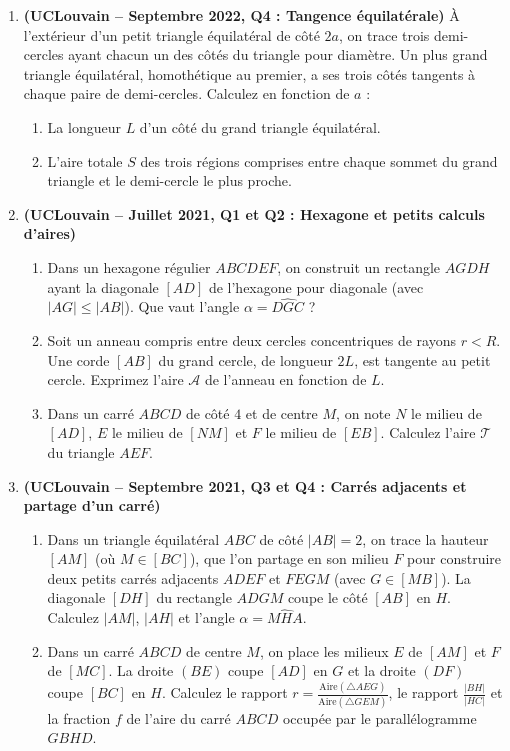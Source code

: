 \begin{enumerate}[label=\textbf{Exercice 5.\arabic* --}, align=left, leftmargin=*]
    \item \textbf{(UCLouvain -- Septembre 2022, Q4 : Tangence équilatérale)}
    À l'extérieur d'un petit triangle équilatéral de côté $2a$, on trace trois demi-cercles ayant chacun un des côtés du triangle pour diamètre. Un plus grand triangle équilatéral, homothétique au premier, a ses trois côtés tangents à chaque paire de demi-cercles. Calculez en fonction de $a$ :
    \begin{enumerate}[label=(\alph*)]
        \item La longueur $L$ d'un côté du grand triangle équilatéral.
        \item L'aire totale $S$ des trois régions comprises entre chaque sommet du grand triangle et le demi-cercle le plus proche.
    \end{enumerate}

    \item \textbf{(UCLouvain -- Juillet 2021, Q1 et Q2 : Hexagone et petits calculs d'aires)}
    \begin{enumerate}[label=(\alph*)]
        \item Dans un hexagone régulier $ABCDEF$, on construit un rectangle $AGDH$ ayant la diagonale $[AD]$ de l'hexagone pour diagonale (avec $|AG| \le |AB|$). Que vaut l'angle $\alpha = \widehat{DGC}$ ?
        \item Soit un anneau compris entre deux cercles concentriques de rayons $r < R$. Une corde $[AB]$ du grand cercle, de longueur $2L$, est tangente au petit cercle. Exprimez l'aire $\mathcal{A}$ de l'anneau en fonction de $L$.
        \item Dans un carré $ABCD$ de côté $4$ et de centre $M$, on note $N$ le milieu de $[AD]$, $E$ le milieu de $[NM]$ et $F$ le milieu de $[EB]$. Calculez l'aire $\mathcal{T}$ du triangle $AEF$.
    \end{enumerate}

    \item \textbf{(UCLouvain -- Septembre 2021, Q3 et Q4 : Carrés adjacents et partage d'un carré)}
    \begin{enumerate}[label=(\alph*)]
        \item Dans un triangle équilatéral $ABC$ de côté $|AB| = 2$, on trace la hauteur $[AM]$ (où $M \in [BC]$), que l'on partage en son milieu $F$ pour construire deux petits carrés adjacents $ADEF$ et $FEGM$ (avec $G \in [MB]$). La diagonale $[DH]$ du rectangle $ADGM$ coupe le côté $[AB]$ en $H$. Calculez $|AM|$, $|AH|$ et l'angle $\alpha = \widehat{MHA}$.
        \item Dans un carré $ABCD$ de centre $M$, on place les milieux $E$ de $[AM]$ et $F$ de $[MC]$. La droite $(BE)$ coupe $[AD]$ en $G$ et la droite $(DF)$ coupe $[BC]$ en $H$. Calculez le rapport $r = \frac{\text{Aire}(\triangle AEG)}{\text{Aire}(\triangle GEM)}$, le rapport $\frac{|BH|}{|HC|}$ et la fraction $f$ de l'aire du carré $ABCD$ occupée par le parallélogramme $GBHD$.
    \end{enumerate}


\end{enumerate}
